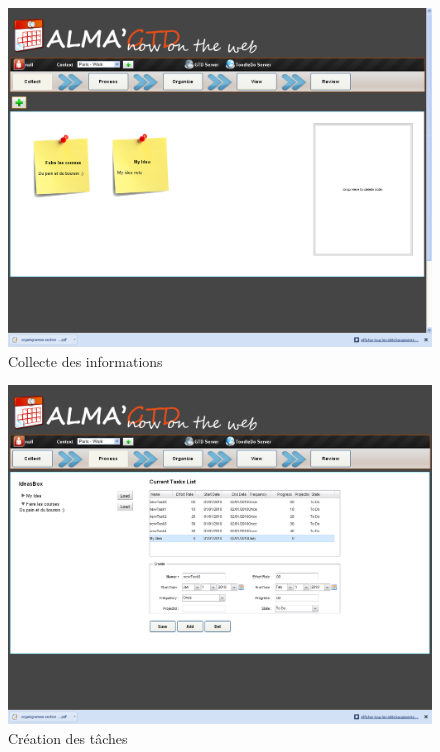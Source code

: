 \begin{figure}[H]
  \begin{center}
  \includegraphics[scale=0.5]{diagrams/C.png}
  \caption{Collecte des informations}
  \end{center}
\end{figure}


\begin{figure}[H]
  \begin{center}
  \includegraphics[scale=0.5]{diagrams/B.png}
  \caption{Création des tâches}
  \end{center}
\end{figure}


